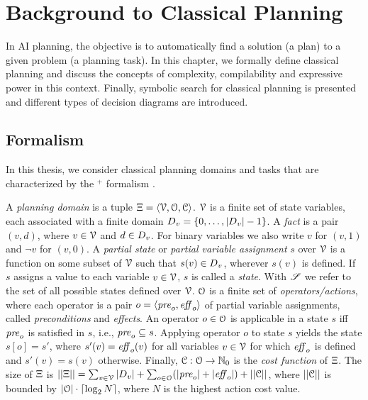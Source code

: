 \chapter{Background to Classical Planning}\label{ch:background}

In AI planning, the objective is to automatically find a solution (a plan) to a given problem (a planning task).
In this chapter, we formally define classical planning and discuss the concepts of complexity, compilability and expressive power in this context.
Finally, symbolic search for classical planning is presented and different types of decision diagrams are introduced.

\section{Formalism}
In this thesis, we consider classical planning domains and tasks that are characterized by the $^+$ formalism \autocite{backstrom-nebel-compint1995}.

\begin{definition}
  \label{def:planning-domain}
  A \emph{planning domain} is a tuple ${\Xi} = \langle \mathcal V, \mathcal O,\mathcal C \rangle$. $\mathcal V$ is a finite set of state variables, each associated with a finite domain $D{}_v = \{0, \dots, |D{}_v| - 1\}$. A \emph{fact} is a pair $(v, d)$, where $v \in \mathcal V$ and $d \in D_v$. For binary variables we also write $v$ for $(v,1)$ and $\lnot v$ for $(v,0)$. A \emph{partial state} or \emph{partial variable assignment} $s$ over $\mathcal V$ is a function on some subset of $\mathcal V$ such that $s(v) \in D{}_v$, wherever $s(v)$ is defined. If $s$ assigns a value to each variable $v \in \mathcal V$, $s$ is called a \emph{state}. With $\mathscr S$ we refer to the set of all possible states defined over $\mathcal V$. $\mathcal O$ is a finite set of \emph{operators/actions}, where each operator is a pair $o = \langle \mathit{pre}_o, \mathit{eff}_o \rangle$ of partial variable assignments, called \emph{preconditions} and \emph{effects}. An operator $o \in \mathcal O$ is applicable in a state $s$ iff $\mathit{pre}_o$ is satisfied in $s$, i.e., $\mathit{pre}_o \subseteq s$. Applying operator $o$ to state $s$ yields the state $s[o]=s'$, where $s'(v) = \mathit{eff}_o(v)$ for all variables $v \in \mathcal V$ for which $\mathit{eff}_o$ is defined and $s'(v) = s(v)$ otherwise. Finally, $\mathcal C: \mathcal O \to \mathbb{N}_0$ is the \emph{cost function} of ${\Xi}$. The size of ${\Xi}$ is $||{\Xi}|| = \sum_{v \in \mathcal V}|D{}_v| + \sum_{o \in \mathcal O}(|\mathit{pre}_o| + |\mathit{eff}_o|) + ||\mathcal C||$, where $||\mathcal C||$ is bounded by $|\mathcal O| \cdot \lceil \log_2 N \rceil$, where $N$ is the highest action cost value.
\end{definition}

